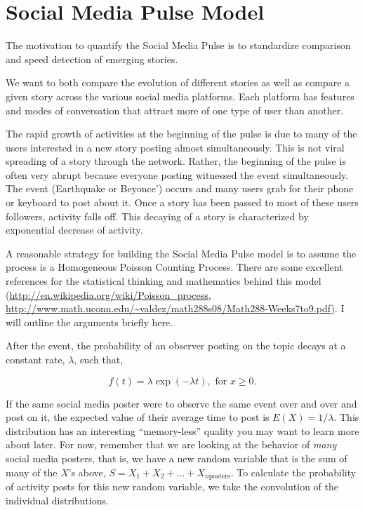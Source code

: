 \documentclass{article}
\begin{document}
\section{Social Media Pulse Model}
\label{sec:model}

The motivation to quantify the Social Media Pulse is to standardize comparison and speed detection of emerging stories.

We want to both compare the evolution of different stories as well as compare a given story across the various social media platforms.  Each platform has features and modes of conversation that attract more of one type of user than another.

The rapid growth of activities at the beginning of the pulse is due to many of the users interested in a new story posting almost simultaneously.  This is not viral spreading of a story through the network.  Rather, the beginning of the pulse is often very abrupt because everyone posting witnessed the event simultaneously. The event (Earthquake or Beyonce') occurs and many users grab for their phone or keyboard to post about it. Once a story has been passed to most of these users followers, activity falls off.  This decaying of a story is characterized by exponential decrease of activity.

A reasonable strategy for building the Social Media Pulse model is to assume the process is a Homogeneous Poisson Counting Process. There are some excellent references for the statistical thinking and mathematics behind this model (\url{http://en.wikipedia.org/wiki/Poisson_process},  \url{http://www.math.uconn.edu/~valdez/math288s08/Math288-Weeks7to9.pdf}).  I will outline the arguments briefly here.

After the event, the probability of an observer posting on the topic decays at a constant rate, $\lambda$, such that,

\begin{equation}
f(t) = \lambda \exp(-\lambda t), \text{ for } x \geq 0.
\label{eq:exponential}
\end{equation}

If the same social media poster were to observe the same event over and over and post on it, the expected value of their average time to post is $E(X)=1/\lambda$.  This distribution has an interesting ``memory-less'' quality you may want to learn more about later.  For now, remember that we are looking at the behavior of \emph{many} social media posters, that is, we have a new random variable that is the sum of many of the $X$'s above, $S = X_1 + X_2 + \ldots + X_{n \text{posters}}$.  To calculate the probability of activity posts for this new random variable, we take the convolution of the individual distributions.
\end{document}
